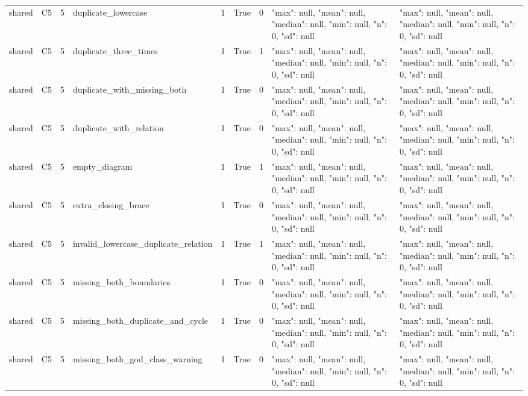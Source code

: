 \begin{tabular}{lllllllll}
shared & C5 & 5 & duplicate\_lowercase & 1 & True & 0 & {"max": null, "mean": null, "median": null, "min": null, "n": 0, "sd": null} & {"max": null, "mean": null, "median": null, "min": null, "n": 0, "sd": null} \\
shared & C5 & 5 & duplicate\_three\_times & 1 & True & 1 & {"max": null, "mean": null, "median": null, "min": null, "n": 0, "sd": null} & {"max": null, "mean": null, "median": null, "min": null, "n": 0, "sd": null} \\
shared & C5 & 5 & duplicate\_with\_missing\_both & 1 & True & 0 & {"max": null, "mean": null, "median": null, "min": null, "n": 0, "sd": null} & {"max": null, "mean": null, "median": null, "min": null, "n": 0, "sd": null} \\
shared & C5 & 5 & duplicate\_with\_relation & 1 & True & 0 & {"max": null, "mean": null, "median": null, "min": null, "n": 0, "sd": null} & {"max": null, "mean": null, "median": null, "min": null, "n": 0, "sd": null} \\
shared & C5 & 5 & empty\_diagram & 1 & True & 1 & {"max": null, "mean": null, "median": null, "min": null, "n": 0, "sd": null} & {"max": null, "mean": null, "median": null, "min": null, "n": 0, "sd": null} \\
shared & C5 & 5 & extra\_closing\_brace & 1 & True & 0 & {"max": null, "mean": null, "median": null, "min": null, "n": 0, "sd": null} & {"max": null, "mean": null, "median": null, "min": null, "n": 0, "sd": null} \\
shared & C5 & 5 & invalid\_lowercase\_duplicate\_relation & 1 & True & 1 & {"max": null, "mean": null, "median": null, "min": null, "n": 0, "sd": null} & {"max": null, "mean": null, "median": null, "min": null, "n": 0, "sd": null} \\
shared & C5 & 5 & missing\_both\_boundaries & 1 & True & 0 & {"max": null, "mean": null, "median": null, "min": null, "n": 0, "sd": null} & {"max": null, "mean": null, "median": null, "min": null, "n": 0, "sd": null} \\
shared & C5 & 5 & missing\_both\_duplicate\_and\_cycle & 1 & True & 0 & {"max": null, "mean": null, "median": null, "min": null, "n": 0, "sd": null} & {"max": null, "mean": null, "median": null, "min": null, "n": 0, "sd": null} \\
shared & C5 & 5 & missing\_both\_god\_class\_warning & 1 & True & 0 & {"max": null, "mean": null, "median": null, "min": null, "n": 0, "sd": null} & {"max": null, "mean": null, "median": null, "min": null, "n": 0, "sd": null} \\

\end{tabular}

